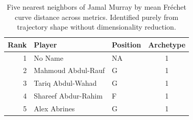 \begin{table}[htbp]
  \centering\small
  \begin{tabular}{rllc}
    \toprule
    Rank & Player & Position & Archetype \\
    \midrule
    1 & No Name & NA & 1 \\
    2 & Mahmoud Abdul-Rauf & G & 1 \\
    3 & Tariq Abdul-Wahad & G & 1 \\
    4 & Shareef Abdur-Rahim & F & 1 \\
    5 & Alex Abrines & G & 1 \\
    \bottomrule
  \end{tabular}
  \caption{Five nearest neighbors of Jamal Murray by mean Fr\'{e}chet curve distance across metrics. Identified purely from trajectory shape without dimensionality reduction.}
\end{table}

